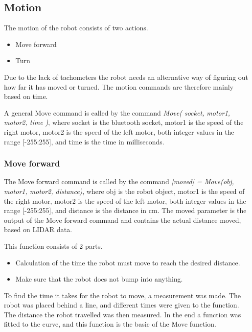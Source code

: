 \subsection{Motion}
The motion of the robot consists of two actions.
\begin{itemize}
\item Move forward 
\item Turn
\end{itemize}
Due to the lack of tachometers the robot needs an alternative way of figuring out how far it has moved or turned. The motion commands are therefore mainly based on time.

A general Move command is called by the command \textit{Move( socket, motor1, motor2, time )}, where socket is the bluetooth socket, motor1 is the speed of the right motor, motor2 is the speed of the left motor, both integer values in the range [-255:255], and time is the time in milliseconds.

\subsubsection{Move forward}
The Move forward command is called by the command \textit{[moved] = Move(obj, motor1, motor2, distance)}, where obj is the robot object, motor1 is the speed of the right motor, motor2 is the speed of the left motor, both integer values in the range [-255:255], and distance is the distance in cm. The moved parameter is the output of the Move forward command and contains the actual distance moved, based on LIDAR data.

This function consists of 2 parts. 
\begin{itemize}
\item Calculation of the time the robot must move to reach the desired distance.
\item Make sure that the robot does not bump into anything.
\end{itemize}
To find the time it takes for the robot to move, a measurement was made. The robot was placed behind a line, and different times were given to the function. The distance the robot travelled was then measured. In the end a function was fitted to the curve, and this function is the basic of the Move function.

